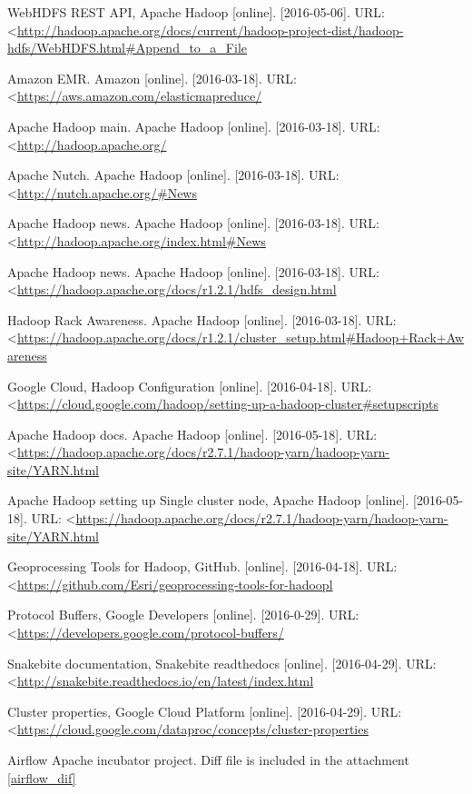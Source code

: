 \documentclass[a4paper,12pt,oneside]{report}
\begin{document}
\begin{thebibliography}{99}
WebHDFS REST API, Apache Hadoop  [online]. [2016-05-06]. URL:  \textless\url{http://hadoop.apache.org/docs/current/hadoop-project-dist/hadoop-hdfs/WebHDFS.html#Append_to_a_File
}

Amazon EMR. Amazon [online]. [2016-03-18]. 
URL: \textless\url{https://aws.amazon.com/elasticmapreduce/}

Apache Hadoop main. Apache Hadoop [online]. [2016-03-18]. 
URL: \textless\url{http://hadoop.apache.org/}

Apache Nutch. Apache Hadoop [online]. [2016-03-18]. 
URL: \textless\url{http://nutch.apache.org/#News
}

Apache Hadoop news. Apache Hadoop [online]. [2016-03-18]. 
URL: \textless\url{http://hadoop.apache.org/index.html#News}


Apache Hadoop news. Apache Hadoop [online]. [2016-03-18]. 
URL: \textless\url{https://hadoop.apache.org/docs/r1.2.1/hdfs_design.html}


Hadoop Rack Awareness. Apache Hadoop [online]. [2016-03-18]. 
URL: \textless\url{https://hadoop.apache.org/docs/r1.2.1/cluster_setup.html#Hadoop+Rack+Awareness}

Google Cloud, Hadoop Configuration [online]. [2016-04-18]. 
URL: \textless\url{https://cloud.google.com/hadoop/setting-up-a-hadoop-cluster#setupscripts}

Apache Hadoop docs. Apache Hadoop [online]. [2016-05-18]. 
URL: \textless\url{https://hadoop.apache.org/docs/r2.7.1/hadoop-yarn/hadoop-yarn-site/YARN.html}

Apache Hadoop setting up Single cluster node, Apache Hadoop [online]. [2016-05-18]. 
URL: \textless\url{https://hadoop.apache.org/docs/r2.7.1/hadoop-yarn/hadoop-yarn-site/YARN.html}


Geoprocessing Tools for Hadoop, GitHub. [online]. [2016-04-18]. 
URL: \textless\url{https://github.com/Esri/geoprocessing-tools-for-hadoopl}

Protocol Buffers, Google Developers [online]. [2016-0-29]. 
URL: \textless\url{https://developers.google.com/protocol-buffers/}

Snakebite documentation, Snakebite readthedocs [online]. [2016-04-29]. 
URL: \textless\url{http://snakebite.readthedocs.io/en/latest/index.html}

Cluster properties, Google Cloud Platform [online]. [2016-04-29]. 
URL: \textless\url{https://cloud.google.com/dataproc/concepts/cluster-properties}


Airflow Apache incubator project. Diff file is included in the attachment \ref{airflow_dif}




\end{thebibliography}
\end{document}
